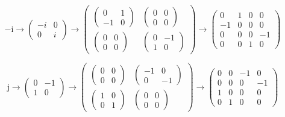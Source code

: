\documentclass[
]{book}
\theoremstyle{definition}
\theoremstyle{definition}
\theoremstyle{definition}
\theoremstyle{definition}
\theoremstyle{remark}
\begin{document}
\[
-\mathrm{i}\rightarrow\begin{pmatrix}-i & 0\\
0 & i
\end{pmatrix}\rightarrow\begin{pmatrix}\begin{pmatrix}0 & 1\\
-1 & 0
\end{pmatrix} & \begin{pmatrix}0 & 0\\
0 & 0
\end{pmatrix}\\
\begin{pmatrix}0 & 0\\
0 & 0
\end{pmatrix} & \begin{pmatrix}0 & -1\\
1 & 0
\end{pmatrix}
\end{pmatrix}\rightarrow\begin{pmatrix}0 & 1 & 0 & 0\\
-1 & 0 & 0 & 0\\
0 & 0 & 0 & -1\\
0 & 0 & 1 & 0
\end{pmatrix}
\]

\[
\mathrm{j}\rightarrow\begin{pmatrix}0 & -1\\
1 & 0
\end{pmatrix}\rightarrow\begin{pmatrix}\begin{pmatrix}0 & 0\\
0 & 0
\end{pmatrix} & \begin{pmatrix}-1 & 0\\
0 & -1
\end{pmatrix}\\
\begin{pmatrix}1 & 0\\
0 & 1
\end{pmatrix} & \begin{pmatrix}0 & 0\\
0 & 0
\end{pmatrix}
\end{pmatrix}\rightarrow\begin{pmatrix}0 & 0 & -1 & 0\\
0 & 0 & 0 & -1\\
1 & 0 & 0 & 0\\
0 & 1 & 0 & 0
\end{pmatrix}
\]
\end{document}
